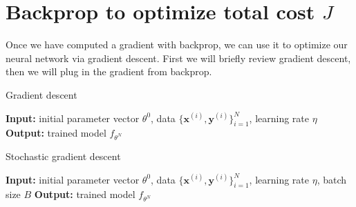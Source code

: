 


\section{Backprop to optimize total cost $J$}
Once we have computed a gradient with backprop, we can use it to optimize our neural network via gradient descent. First we will briefly review gradient descent, then we will plug in the gradient from backprop.

\begin{algorithm}[h]
\label{gradient_descent}
\SetAlgoVlined
\DontPrintSemicolon
\caption{Gradient descent}
{\bf Input:} initial parameter vector $\theta^{0}$, data $\{\mathbf{x}^{(i)},\mathbf{y}^{(i)}\}_{i=1}^N$, learning rate $\eta$\;
{\bf Output:} trained model $f_{\theta^{N}}$\;
\end{algorithm}

\begin{algorithm}[h]
\label{SGD}
\SetAlgoVlined
\DontPrintSemicolon
\caption{Stochastic gradient descent}
{\bf Input:} initial parameter vector $\theta^{0}$, data $\{\mathbf{x}^{(i)},\mathbf{y}^{(i)}\}_{i=1}^N$, learning rate $\eta$, batch size $B$\;
{\bf Output:} trained model $f_{\theta^{N}}$\;
\end{algorithm}

